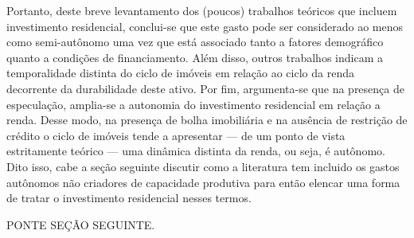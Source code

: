 Portanto, deste breve levantamento dos (poucos) trabalhos teóricos que incluem investimento residencial, conclui-se que este gasto pode ser considerado ao menos como semi-autônomo uma vez que está associado tanto a fatores demográfico quanto a condições de financiamento.
Além disso, outros trabalhos indicam a temporalidade distinta do ciclo de imóveis em relação ao ciclo da renda decorrente da durabilidade deste ativo.
Por fim, argumenta-se que na presença de especulação, amplia-se a autonomia do investimento residencial em relação a renda. 
Desse modo, na presença de bolha imobiliária e na ausência de restrição de crédito o ciclo de imóveis tende a apresentar --- de um ponto de vista estritamente teórico --- uma dinâmica distinta da renda, ou seja, é autônomo.
Dito isso, cabe a seção seguinte discutir como a literatura tem incluido os gastos autônomos não criadores de capacidade produtiva para então elencar uma forma de tratar o investimento residencial nesses termos.


PONTE SEÇÃO SEGUINTE.









\begin{comment}
Feita esta descrição, Duesenberry pontua: (i) a flutuação dos imóveis decorrente de um desequilíbrio inicial é amortecida; (ii) a flutuação da renda causará flutuações no investimento residencial com defasagem; (iii) este setor possui demanda de reserva e, portanto, os efeitos de uma recessão nesse setor são mais dispersos ao longo do tempo que, por sua vez, contribui para que a perda de dinamismo da renda seja atenuado.

\end{comment}